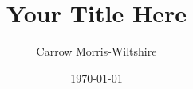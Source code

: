 \documentclass[a4paper,11pt]{article}
\title{Your Title Here}
\author{Carrow Morris-Wiltshire}
\date{\today}
\begin{document}
\maketitle

\label{sec:abstract}


\label{sec:introduction}


\label{sec:research_objectives}


\label{sec:literature_review}


\label{sec:methodology}


\label{sec:results}


\label{sec:discussion}


\label{sec:conclusion}




\end{document}
